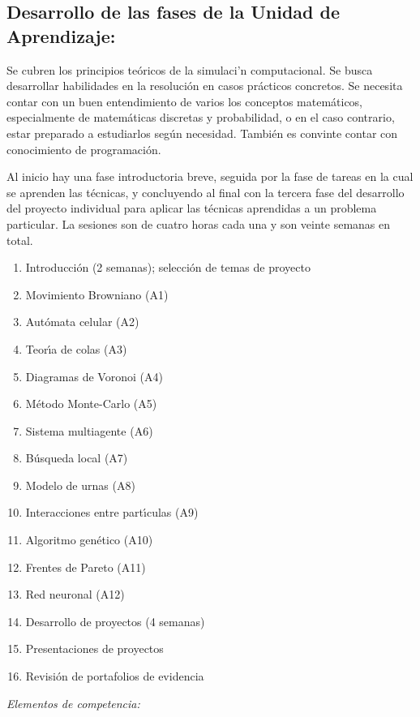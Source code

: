 \documentclass[10 pt]{article}
\begin{document}
\subsection{Desarrollo de las fases de la Unidad de Aprendizaje:}

Se cubren los principios te\'{o}ricos de la simulaci'n
computacional. Se busca desarrollar habilidades en la resoluci\'{o}n
en casos pr\'{a}cticos concretos. Se necesita contar con un buen
entendimiento de varios los conceptos matem\'{a}ticos, especialmente
de matem\'{a}ticas discretas y probabilidad, o en el caso contrario,
estar preparado a estudiarlos seg\'{u}n necesidad. Tambi\'{e}n es
convinte contar con conocimiento de programaci\'{o}n.

Al inicio hay una fase introductoria breve, seguida por la fase de
tareas en la cual se aprenden las t\'{e}cnicas, y concluyendo al final
con la tercera fase del desarrollo del proyecto individual para
aplicar las t\'{e}cnicas aprendidas a un problema particular. La
sesiones son de cuatro horas cada una y son veinte semanas en total.
\begin{enumerate}[itemsep=-3pt]
\item{Introducci\'{o}n (2 semanas); selecci\'{o}n de temas de proyecto}
\item{Movimiento Browniano (A1)}
\item{Aut\'{o}mata celular (A2)}
\item{Teor\'{\i}a de colas (A3)}
\item{Diagramas de Voronoi (A4)}
\item{M\'{e}todo Monte-Carlo (A5)}
\item{Sistema multiagente (A6)}
\item{B\'{u}squeda local (A7)}
\item{Modelo de urnas (A8)}
\item{Interacciones entre part\'{\i}culas (A9)}
\item{Algoritmo gen\'{e}tico (A10)}
\item{Frentes de Pareto (A11)}
\item{Red neuronal (A12)}
\item{Desarrollo de proyectos (4 semanas)}  
\item{Presentaciones de proyectos}
\item{Revisi\'{o}n de portafolios de evidencia}
\end{enumerate}

{\em Elementos de competencia:}


\end{document}

